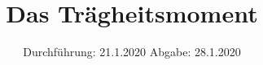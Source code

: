 

\subject{Versuch Nr. 101}
\title{Das Trägheitsmoment}
\date{%
  Durchführung: 21.1.2020
  \hspace{3em}
  Abgabe: 28.1.2020
}


\setlength{\parindent}{0pt} %

\maketitle
\thispagestyle{empty}
\tableofcontents
\newpage







\printbibliography{}


